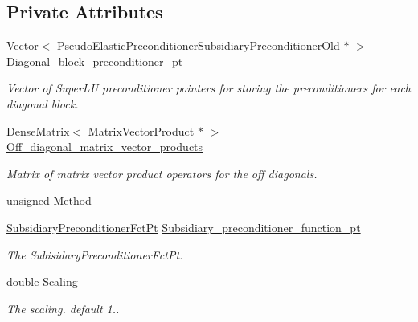 \subsection*{Private Attributes}
\begin{DoxyCompactItemize}
\item 
Vector$<$ \hyperlink{classoomph_1_1PseudoElasticPreconditionerSubsidiaryPreconditionerOld}{Pseudo\+Elastic\+Preconditioner\+Subsidiary\+Preconditioner\+Old} $\ast$ $>$ \hyperlink{classoomph_1_1PseudoElasticPreconditionerSubsidiaryBlockPreconditionerOld_a41bd3e3258d55a595df9af6690df2d2f}{Diagonal\+\_\+block\+\_\+preconditioner\+\_\+pt}
\begin{DoxyCompactList}\small\item\em Vector of Super\+LU preconditioner pointers for storing the preconditioners for each diagonal block. \end{DoxyCompactList}\item 
Dense\+Matrix$<$ Matrix\+Vector\+Product $\ast$ $>$ \hyperlink{classoomph_1_1PseudoElasticPreconditionerSubsidiaryBlockPreconditionerOld_ac736d6b0390de55bb96cc9475a4cabac}{Off\+\_\+diagonal\+\_\+matrix\+\_\+vector\+\_\+products}
\begin{DoxyCompactList}\small\item\em Matrix of matrix vector product operators for the off diagonals. \end{DoxyCompactList}\item 
unsigned \hyperlink{classoomph_1_1PseudoElasticPreconditionerSubsidiaryBlockPreconditionerOld_a6b45cbf207717b9ffe326041f78ea85b}{Method}
\item 
\hyperlink{classoomph_1_1PseudoElasticPreconditionerSubsidiaryBlockPreconditionerOld_a85f57923e70244d5fde0538946eb8c3d}{Subsidiary\+Preconditioner\+Fct\+Pt} \hyperlink{classoomph_1_1PseudoElasticPreconditionerSubsidiaryBlockPreconditionerOld_a376d5fd2ddf9f367854b41478a269ae2}{Subsidiary\+\_\+preconditioner\+\_\+function\+\_\+pt}
\begin{DoxyCompactList}\small\item\em The Subisidary\+Preconditioner\+Fct\+Pt. \end{DoxyCompactList}\item 
double \hyperlink{classoomph_1_1PseudoElasticPreconditionerSubsidiaryBlockPreconditionerOld_a588f4623c606d01c3e3feb3c09023f03}{Scaling}
\begin{DoxyCompactList}\small\item\em The scaling. default 1.. \end{DoxyCompactList}\end{DoxyCompactItemize}


